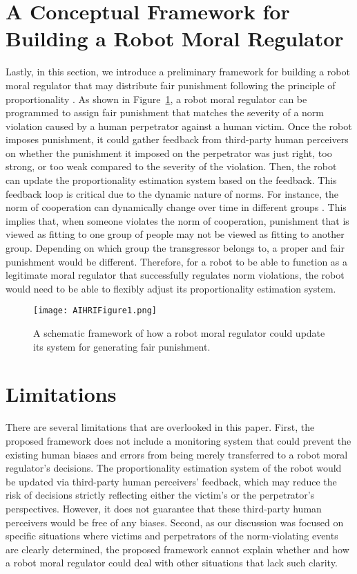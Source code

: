 \documentclass{article} %
\begin{document}
\vspace{-3.15mm}
\section{A Conceptual Framework for Building a Robot Moral Regulator}
Lastly, in this section, we introduce a preliminary framework for building a robot moral regulator that may distribute fair punishment following the principle of proportionality \cite{darley2003psychology,sep-justice-retributive}.  As shown in Figure~\ref{fig:AIHRIFigure1}, a robot moral regulator can be programmed to assign fair punishment that matches the severity of a norm violation caused by a human perpetrator against a human victim. Once the robot imposes punishment, it could gather feedback from third-party human perceivers on whether the punishment it imposed on the perpetrator was just right, too strong, or too weak compared to the severity of the violation. Then, the robot can update the proportionality estimation system based on the feedback. This feedback loop is critical due to the dynamic nature of norms. For instance, the norm of cooperation can dynamically change over time in different groups \cite{titlestad2019dynamic}. This implies that, when someone violates the norm of cooperation, punishment that is viewed as fitting to one group of people may not be viewed as fitting to another group. Depending on which group the transgressor belongs to, a proper and fair punishment would be different. Therefore, for a robot to be able to function as a legitimate moral regulator that successfully regulates norm violations, the robot would need to be able to flexibly adjust its proportionality estimation system.

\vspace{-3.50mm}
\begin{figure}[h]
\centering
\texttt{[image: AIHRIFigure1.png]}
\caption{A schematic framework of how a robot moral regulator could update its system for generating fair punishment.}
\label{fig:AIHRIFigure1}
\end{figure}

\vspace{-3.54mm}
\section{Limitations}
There are several limitations that are overlooked in this paper. First, the proposed framework does not include a monitoring system that could prevent the existing human biases and errors \cite{o2016weapons,sourdin2018judge} from being merely transferred to a robot moral regulator's decisions. The proportionality estimation system of the robot would be updated via third-party human perceivers' feedback, which may reduce the risk of decisions strictly reflecting either the victim's or the perpetrator's perspectives. However, it does not guarantee that these third-party human perceivers would be free of any biases. Second, as our discussion was focused on specific situations where victims and perpetrators of the norm-violating events are clearly determined, the proposed framework cannot explain whether and how a robot moral regulator could deal with other situations that lack such clarity.
\end{document}
